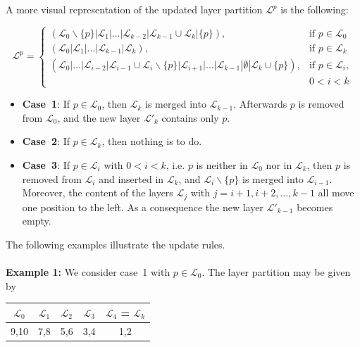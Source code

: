 \documentclass[a4paper,12pt, titlepage]{article}  %
\newcommand{\cl}{\mathcal{L}}   %
\begin{document}
\noindent A more visual representation of the updated layer partition $\cl^p$ is the following:

\[
\boxed{
\cl^p = \begin{cases}
 (\cl_0\backslash\{p\}|\cl_1|\dots|\cl_{k-2}|\cl_{k-1}\cup \cl_k| \{p\} ),
 & \textrm{if } p\in \cl_0 \\ 

 (\cl_0| \cl_1|\dots|\cl_{k-1}| \cl_k  ),
 & \textrm{if } p\in \cl_k \\ 
 
  (\cl_0|\dots|\cl_{i-2}|\cl_{i-1}\cup \cl_{i}\backslash \{p\}| \cl_{i+1}|\dots|\cl_{k-1}| \emptyset|\cl_k\cup \{p\} ),
 & \textrm{if } p\in \cl_i, \\
 &                   0<i<k

\end{cases}
}
\]

\begin{itemize}
	\item \textbf{Case~1}: If $p \in \cl_0$, then $\cl_k$ is merged into $\cl_{k-1}$. Afterwards $p$ is removed
	from $\cl_0$, and the new layer $\cl'_{k}$ contains only $p$.

	\item \textbf{Case~2}: If $p \in \cl_k$, then nothing is to do.
	
	\item \textbf{Case~3}: If $p \in \cl_i$ with $0<i<k$, i.e. $p$ is neither in $\cl_0$ nor in $\cl_k$, 
	then $p$ is removed from $\cl_i$ and inserted in $\cl_k$,
	and $\cl_i \backslash \{p\}$ is merged into $\cl_{i-1}$. Moreover, the content of the layers 
	$\cl_j$ with $j=i+1,i+2,\dots,k-1$ all move one position to the left. As a consequence the new layer $\cl'_{k-1}$ 
	becomes empty.
	
\end{itemize}


\noindent The following examples illustrate the update rules.\\
\\
\textbf{Example 1:}
We consider case~1 with $p\in\cl_0$. The layer partition may be given by

\begin{center}
	\begin{tabular}[ht]{|c|c|c|c|c|}
	  \hline
		$\cl_0$ & $\cl_1$ & $\cl_2$ & $\cl_3$ & $\cl_4$ = $\cl_k$ \\
		\hline		
		9,10 & 7,8 & 5,6 & 3,4 & 1,2 \\
		\hline
	\end{tabular}
\end{center}
 
\end{document}
